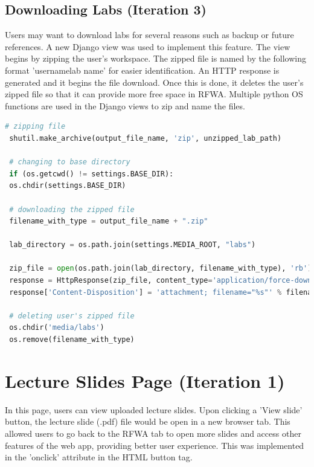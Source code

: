 \documentclass{l4proj}
\begin{document}
\subsection{Downloading Labs (Iteration 3)}

Users may want to download labs for several reasons such as backup or future references. A new Django view was used to implement this feature. The view begins by zipping the user's workspace. The zipped file is named by the following format 'username\textunderscore lab name' for easier identification. An HTTP response is generated and it begins the file download. Once this is done, it deletes the user's zipped file so that it can provide more free space in RFWA. Multiple python OS functions are used in the Django views to zip and name the files.

\begin{lstlisting}[language=python, caption={Code snippet from Django's download\textunderscore lab view which zips and allow users to download lab files.}, label=lst:download_lab]
 # zipping file
 shutil.make_archive(output_file_name, 'zip', unzipped_lab_path)

 # changing to base directory
 if (os.getcwd() != settings.BASE_DIR):
 os.chdir(settings.BASE_DIR)

 # downloading the zipped file
 filename_with_type = output_file_name + ".zip"

 lab_directory = os.path.join(settings.MEDIA_ROOT, "labs")

 zip_file = open(os.path.join(lab_directory, filename_with_type), 'rb')
 response = HttpResponse(zip_file, content_type='application/force-download')
 response['Content-Disposition'] = 'attachment; filename="%s"' % filename_with_type

 # deleting user's zipped file
 os.chdir('media/labs')
 os.remove(filename_with_type)

\end{lstlisting}

\section{Lecture Slides Page (Iteration 1)}

In this page, users can view uploaded lecture slides. Upon clicking a 'View slide' button, the lecture slide (.pdf) file would be open in a new browser tab. This allowed users to go back to the RFWA tab to open more slides and access other features of the web app, providing better user experience. This was implemented in the 'onclick' attribute in the HTML button tag.
\end{document}
